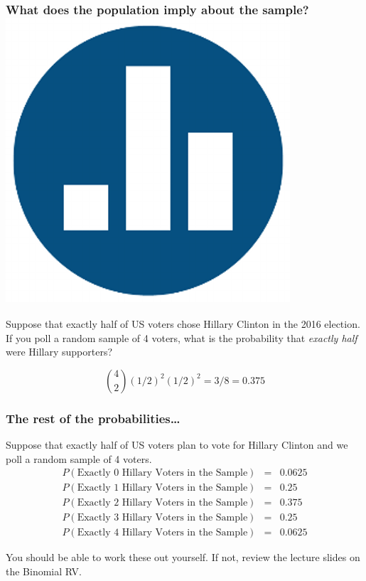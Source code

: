 \documentclass[handout]{beamer}
\begin{document}
\begin{frame}
  \frametitle{What does the population imply about the sample? \hfill\includegraphics[scale = 0.05]{./images/clicker}}
Suppose that exactly half of US voters chose Hillary Clinton in the 2016 election.
If you poll a random sample of 4 voters, what is the probability that \emph{exactly half} were Hillary supporters? 

\pause

\alert{$${4 \choose 2} \left( 1/2 \right)^2 \left( 1/2 \right)^2 = 3/8 = 0.375$$}
\end{frame}
\begin{frame}
  \frametitle{The rest of the probabilities\dots}
  Suppose that exactly half of US voters plan to vote for Hillary Clinton and we poll a random sample of 4 voters.
  \begin{eqnarray*}
    P\left( \mbox{Exactly 0 Hillary Voters in the Sample} \right) &=& 0.0625\\
    P\left( \mbox{Exactly 1 Hillary Voters in the Sample} \right) &=& 0.25\\
    P\left( \mbox{Exactly 2 Hillary Voters in the Sample} \right) &=& 0.375\\
    P\left( \mbox{Exactly 3 Hillary Voters in the Sample} \right) &=& 0.25\\
    P\left( \mbox{Exactly 4 Hillary Voters in the Sample} \right) &=& 0.0625 
  \end{eqnarray*}

  \vspace{1em}
  \alert{You should be able to work these out yourself. If not, review the lecture slides on the Binomial RV.}
\end{frame}
\end{document}
